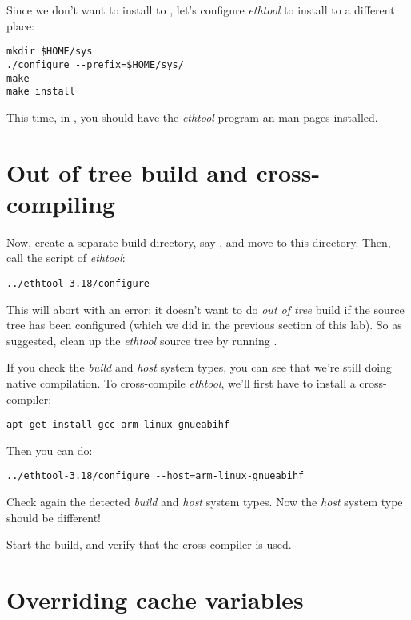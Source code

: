 Since we don't want to install to , let's configure
{\em ethtool} to install to a different place:

\begin{verbatim}
mkdir $HOME/sys
./configure --prefix=$HOME/sys/
make
make install
\end{verbatim}

This time, in , you should have the {\em ethtool}
program an man pages installed.

\section{Out of tree build and cross-compiling}

Now, create a separate build directory, say
, and move to this
directory. Then, call the  script of {\em ethtool}:

\begin{verbatim}
../ethtool-3.18/configure
\end{verbatim}

This will abort with an error: it doesn't want to do {\em out of tree}
build if the source tree has been configured (which we did in the
previous section of this lab). So as suggested, clean up the {\em
  ethtool} source tree by running .

If you check the {\em build} and {\em host} system types, you can see
that we're still doing native compilation. To cross-compile {\em
  ethtool}, we'll first have to install a cross-compiler:

\begin{verbatim}
apt-get install gcc-arm-linux-gnueabihf
\end{verbatim}

Then you can do:

\begin{verbatim}
../ethtool-3.18/configure --host=arm-linux-gnueabihf
\end{verbatim}

Check again the detected {\em build} and {\em host} system types. Now
the {\em host} system type should be different!

Start the build, and verify that the cross-compiler is used.

\section{Overriding cache variables}

